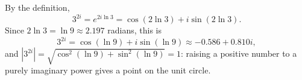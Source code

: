 By the definition,
\[3^{2i}=e^{2i\ln3}=\cos(2\ln3)+i\sin(2\ln3).\]
Since $2\ln3=\ln9\approx2.197$ radians, this is
\[3^{2i}=\boxed{\cos(\ln9)+i\sin(\ln9)}\approx-0.586+0.810i,\]
and $\left|3^{2i}\right|=\sqrt{\cos^2(\ln9)+\sin^2(\ln9)}=\boxed{1}$: raising a positive number to a purely imaginary power gives a point on the unit circle.
